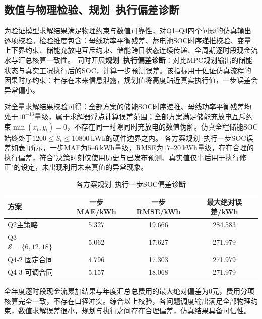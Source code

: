 
\subsection{数值与物理检验、规划--执行偏差诊断}
为验证模型求解结果满足物理约束与数值可靠性，对Q1--Q4四个问题的仿真输出逐项校验。检验维度包含：母线功率平衡残差、蓄电池SOC时序递推校验、变量上下界约束、储能充放电互斥约束、储能跨日状态连续传递、全周期逐时段现金流水与汇总核算一致性。
同时开展\textbf{规划--执行偏差诊断}：对比MPC规划输出的储能状态与真实工况执行后的SOC，计算一步预测误差。该指标用于佐证仿真流程的因果时序约束：若存在未来信息泄露，规划值将高度贴近真实执行值，一步误差会异常偏小。

对全量求解结果校验可得：全部方案的储能SOC时序递推、母线功率平衡残差均处于$10^{-13}$量级，属于求解器浮点计算误差范围；全部方案满足储能充放电互斥约束$\min(x_t,y_t)=0$，不存在同一时隙同时充放电的数值伪解。仿真全程储能SOC始终处于$1200\le S_t\le10800\ \mathrm{kWh}$的硬件边界之内。
各方案规划--执行一步SOC误差如表\ref{tab:exec_diag}所示，一步MAE为$5$--$6\ \mathrm{kWh}$量级，RMSE为$17$--$20\ \mathrm{kWh}$量级，存在合理的执行偏差，符合"决策时刻仅使用历史与已发布预测、真实值仅事后用于执行修正"的设定，未出现利用未来真值的异常现象。
\begin{table}[htbp]
\centering
\caption{各方案规划--执行一步SOC偏差诊断}
\label{tab:exec_diag}
\begin{tabular}{lccc}
\toprule
方案 & 一步MAE/kWh & 一步RMSE/kWh & 最大绝对误差/kWh \\
\midrule
Q2主策略 & 5.327 & 19.666 & 284.583 \\
Q3 $\mathcal{S}=\{6,12,18\}$ & 5.062 & 17.627 & 271.979 \\
Q4-2 固定合同 & 4.796 & 17.303 & 271.979 \\
Q4-3 可调合同 & 5.157 & 18.068 & 271.979 \\
\bottomrule
\end{tabular}
\end{table}
全年度逐时段现金流累加结果与年度汇总总费用的最大绝对偏差为$0$元，费用分项核算完全一致，不存在口径冲突。综合以上校验，各问题调度输出满足全部物理约束，数值求解误差很小，规划与执行之间存在合理偏差，仿真结果具备可信性。


